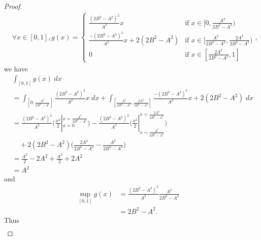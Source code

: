 \begin{proof}
\begin{align*}
         & \forall x \in [0, 1], g(x) = \begin{cases}
                                            \frac{(2 B^2 - A^2)^2}{A^2} x                    & \text{if } x \in [0, \frac{A^2}{2 B^2 - A^2})                         \\
                                            \frac{-(2 B^2 - A^2)^2}{A^2} x + 2 (2 B^2 - A^2) & \text{if } x \in [\frac{A^2}{2 B^2 - A^2}, \frac{2 A^2}{2 B^2 - A^2}) \\
                                            0                                                & \text{if } x \in [\frac{2 A^2}{2 B^2 - A^2}, 1]
                                        \end{cases},
    \end{align*}
    we have
    \begin{align*}
         & \int_{[0, 1]} g(x) \; dx                                                                                                                                                                                              \\
         & = \int_{[0, \frac{A^2}{2 B^2 - A^2}]} \frac{(2 B^2 - A^2)^2}{A^2} x \; dx + \int_{[\frac{A^2}{2 B^2 - A^2}, \frac{2 A^2}{2 B^2 - A^2}]} \frac{-(2 B^2 - A^2)^2}{A^2} x + 2 (2 B^2 - A^2) \; dx                        \\
         & = \frac{(2 B^2 - A^2)^2}{A^2} \bigg(\frac{x^2}{2}|_{x = 0}^{x = \frac{A^2}{2 B^2 - A^2}}\bigg) - \frac{(2 B^2 - A^2)^2}{A^2} \bigg(\frac{x^2}{2}|_{x = \frac{A^2}{2 B^2 - A^2}}^{x = \frac{2 A^2}{2 B^2 - A^2}}\bigg) \\
         & \quad + 2 (2 B^2 - A^2) \bigg(\frac{2 A^2}{2 B^2 - A^2} - \frac{A^2}{2 B^2 - A^2}\bigg)                                                                                                                               \\
         & = \frac{A^2}{2} - 2 A^2 + \frac{A^2}{2} + 2 A^2                                                                                                                                                                       \\
         & = A^2
    \end{align*}
    and
    \begin{align*}
        \sup_{[0, 1]} g(x) & = \frac{(2 B^2 - A^2)^2}{A^2} \frac{A^2}{2 B^2 - A^2} \\
                           & = 2 B^2 - A^2.
    \end{align*}
    Thus
    \begin{align*}

\end{align*}
\end{proof}
